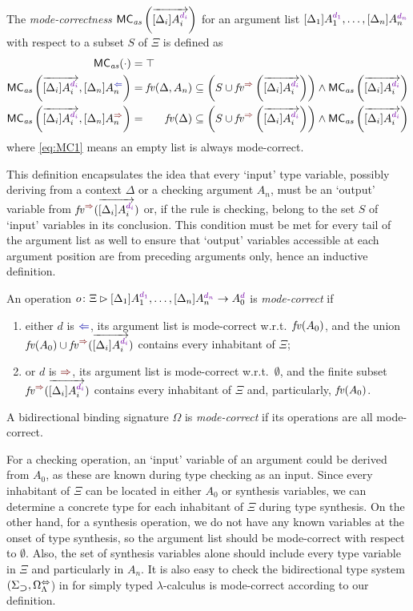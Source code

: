 \begin{definition}\label{def:mode-correctness-args}
  The \emph{mode-correctness} $\MCas\left(\biargvec\right)$ for an argument list $\biargs$ with respect to a subset $S$ of $\Xi$ is defined as
  \begin{align}
    \label{eq:MC1} \MCas( \cdot ) & = \top \\
    \label{eq:MC3} \MCas\left(\biargvec, \chkbiarg[n]\right)
                                  & = \fv(\Delta, A_n) \subseteq \left( S \cup \synvar\left(\biargvec\right)\right) \land \MCas\left(\biargvec\right) \\
    \label{eq:MC2} \MCas\left(\biargvec, \synbiarg[n]\right) 
                                  & = \phantom{, A_n} \fv(\Delta) \subseteq \left( S \cup \synvar\left(\biargvec\right)\right) \land  \MCas\left(\biargvec\right)
  \end{align}
  where \eqref{eq:MC1} means an empty list is always mode-correct.
\end{definition}
This definition encapsulates the idea that every `input' type variable, possibly deriving from a context $\Delta$ or a checking argument $A_n$, must be an `output' variable from $\synvar(\biargvec)$ or, if the rule is checking, belong to the set $S$ of `input' variables in its conclusion.
This condition must be met for every tail of the argument list as well to ensure that `output' variables accessible at each argument position are from preceding arguments only, hence an inductive definition.
\begin{definition}\label{def:mode-correctness}
  An operation $\biop$ is \emph{mode-correct} if 
  \begin{enumerate}
    \item either $d$ is $\chk$, its argument list is mode-correct w.r.t.\ $\mathit{fv}(A_0)$, and the union $\fv(A_0) \cup \synvar(\biargvec)$ contains every inhabitant of $\Xi$;
    \item or $d$ is $\syn$, its argument list is mode-correct w.r.t.\ $\emptyset$, and the finite subset $\synvar(\biargvec)$ contains every inhabitant of $\Xi$ and, particularly, $\mathit{fv}(A_0)$.
  \end{enumerate}
  A bidirectional binding signature $\Omega$ is \emph{mode-correct} if its operations are all mode-correct.
\end{definition}
For a checking operation, an `input' variable of an argument could be derived from $A_0$, as these are known during type checking as an input.
Since every inhabitant of $\Xi$ can be located in either $A_0$ or synthesis variables, we can determine a concrete type for each inhabitant of $\Xi$ during type synthesis.
On the other hand, for a synthesis operation, we do not have any known variables at the onset of type synthesis, so the argument list should be mode-correct with respect to $\emptyset$.
Also, the set of synthesis variables alone should include every type variable in $\Xi$ and particularly in $A_n$.
It is also easy to check the bidirectional type system $(\Sigma_{\mathbin{\bm{\supset}}}, \Omega^{\Leftrightarrow}_{\Lambda}$) in  for simply typed $\lambda$-calculus is mode-correct according to our definition.

